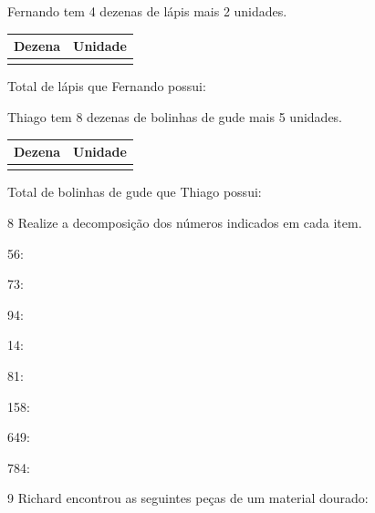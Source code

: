 \begin{escolha}

\item
  Fernando tem 4 dezenas de lápis mais 2 unidades.

\begin{longtable}[]{@{}ll@{}}
\toprule
Dezena & Unidade\tabularnewline
\midrule
\endhead
&\tabularnewline
\bottomrule
\end{longtable}

Total de lápis que Fernando possui:


\item Thiago tem 8 dezenas de bolinhas de gude mais 5 unidades.

\begin{longtable}[]{@{}ll@{}}
\toprule
Dezena & Unidade\tabularnewline
\midrule
\endhead
&\tabularnewline
\bottomrule
\end{longtable}

Total de bolinhas de gude que Thiago possui:

\end{escolha}

\num{8} Realize a decomposição dos números indicados em cada item.

\begin{escolha}
\item 56: 

\item 73: 

\item 94: 

\item 14: 

\item 81: 

\item 158: 

\item 649: 

\item 784: 
\end{escolha}

\pagebreak
\num{9} Richard encontrou as seguintes peças de um material dourado:

